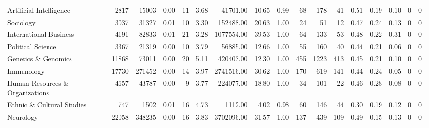 \begin{tabular}{lrrrrrrrrrrrrrrrr}
        Artificial Intelligence &   2817 &  15003 &     0.00 &                        11 &             3.68 &   41701.00 &      10.65 &  0.99 &                  68 &                          178 &                  41 &        0.51 &          0.19 &            0.10 &         0 &      0 \\
                      Sociology &   3037 &  31327 &     0.01 &                        10 &             3.30 &  152488.00 &      20.63 &  1.00 &                  24 &                           51 &                  12 &        0.47 &          0.24 &            0.13 &         0 &      0 \\
         International Business &   4191 &  82833 &     0.01 &                        21 &             3.28 & 1077554.00 &      39.53 &  1.00 &                  64 &                          133 &                  53 &        0.48 &          0.22 &            0.31 &         0 &      0 \\
              Political Science &   3367 &  21319 &     0.00 &                        10 &             3.79 &   56885.00 &      12.66 &  1.00 &                  55 &                          160 &                  40 &        0.44 &          0.21 &            0.06 &         0 &      0 \\
            Genetics \& Genomics &  11868 &  73011 &     0.00 &                        20 &             5.11 &  420403.00 &      12.30 &  1.00 &                 455 &                         1223 &                 413 &        0.45 &          0.21 &            0.10 &         0 &      0 \\
                     Immunology &  17730 & 271452 &     0.00 &                        14 &             3.97 & 2741516.00 &      30.62 &  1.00 &                 170 &                          619 &                 141 &        0.44 &          0.24 &            0.05 &         0 &      0 \\
Human Resources \& Organizations &   4657 &  43787 &     0.00 &                         9 &             3.77 &  224077.00 &      18.80 &  1.00 &                  34 &                          101 &                  22 &        0.46 &          0.28 &            0.08 &         0 &      0 \\
      Ethnic \& Cultural Studies &    747 &   1502 &     0.01 &                        16 &             4.73 &    1112.00 &       4.02 &  0.98 &                  60 &                          146 &                  44 &        0.30 &          0.19 &            0.12 &         0 &      0 \\
                      Neurology &  22058 & 348235 &     0.00 &                        16 &             3.83 & 3702096.00 &      31.57 &  1.00 &                 137 &                          439 &                 109 &        0.49 &          0.15 &            0.13 &         0 &      0 \\
\bottomrule
\end{tabular}
